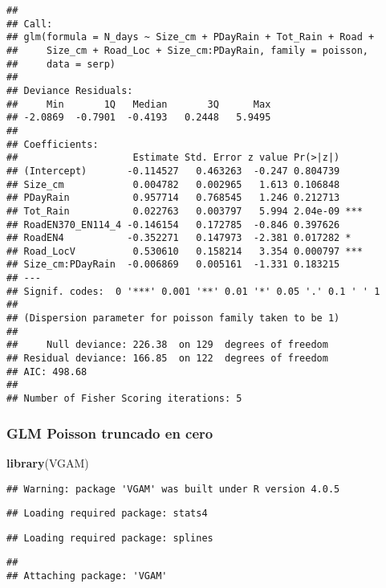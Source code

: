 \documentclass[
]{book}
\newenvironment{Shaded}{\begin{snugshade}}{\end{snugshade}}
\newcommand{\KeywordTok}[1]{\textcolor[rgb]{0.13,0.29,0.53}{\textbf{#1}}}
\newcommand{\NormalTok}[1]{#1}
\begin{document}
\begin{verbatim}
## 
## Call:
## glm(formula = N_days ~ Size_cm + PDayRain + Tot_Rain + Road + 
##     Size_cm + Road_Loc + Size_cm:PDayRain, family = poisson, 
##     data = serp)
## 
## Deviance Residuals: 
##     Min       1Q   Median       3Q      Max  
## -2.0869  -0.7901  -0.4193   0.2448   5.9495  
## 
## Coefficients:
##                    Estimate Std. Error z value Pr(>|z|)    
## (Intercept)       -0.114527   0.463263  -0.247 0.804739    
## Size_cm            0.004782   0.002965   1.613 0.106848    
## PDayRain           0.957714   0.768545   1.246 0.212713    
## Tot_Rain           0.022763   0.003797   5.994 2.04e-09 ***
## RoadEN370_EN114_4 -0.146154   0.172785  -0.846 0.397626    
## RoadEN4           -0.352271   0.147973  -2.381 0.017282 *  
## Road_LocV          0.530610   0.158214   3.354 0.000797 ***
## Size_cm:PDayRain  -0.006869   0.005161  -1.331 0.183215    
## ---
## Signif. codes:  0 '***' 0.001 '**' 0.01 '*' 0.05 '.' 0.1 ' ' 1
## 
## (Dispersion parameter for poisson family taken to be 1)
## 
##     Null deviance: 226.38  on 129  degrees of freedom
## Residual deviance: 166.85  on 122  degrees of freedom
## AIC: 498.68
## 
## Number of Fisher Scoring iterations: 5
\end{verbatim}

\hypertarget{glm-poisson-truncado-en-cero}{%
\subsubsection{GLM Poisson truncado en cero}\label{glm-poisson-truncado-en-cero}}

\begin{Shaded}
\begin{Highlighting}[]
\KeywordTok{library}\NormalTok{(VGAM)}
\end{Highlighting}
\end{Shaded}

\begin{verbatim}
## Warning: package 'VGAM' was built under R version 4.0.5
\end{verbatim}

\begin{verbatim}
## Loading required package: stats4
\end{verbatim}

\begin{verbatim}
## Loading required package: splines
\end{verbatim}

\begin{verbatim}
## 
## Attaching package: 'VGAM'
\end{verbatim}
\end{document}
